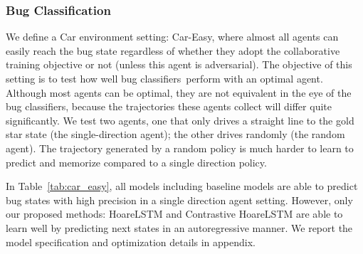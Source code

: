 \documentclass{article}
\newcommand{\bugcls}{bug classifiers~}
\newcommand{\EDIT}[1]{#1}%
\begin{document}
\subsubsection{\EDIT{Bug Classification}}
\label{sec:bug-identification}
\vspace{-2mm} 

\EDIT{We define a Car environment setting: Car-Easy,} where almost all agents can easily reach the bug state regardless of whether they adopt the collaborative training objective or not (unless this agent is adversarial). \EDIT{The objective of this setting} is to test how well \bugcls perform  with an optimal agent.
\EDIT{Although most agents can be optimal, they are not equivalent in the eye of the bug classifiers, because the trajectories these agents collect will differ quite significantly. We test two agents, one that only drives a straight line to the gold star state (the single-direction agent); the other drives randomly (the random agent). The trajectory generated by a random policy is much harder to learn to predict and memorize compared to a single direction policy.}

In Table~\ref{tab:car_easy}, all models including baseline models are able to predict bug states with high precision in a single direction agent setting. However, only our proposed methods: HoareLSTM and Contrastive HoareLSTM are able to learn well by predicting next states in an autoregressive manner. 
We report the model specification and optimization details in appendix.
\end{document}

